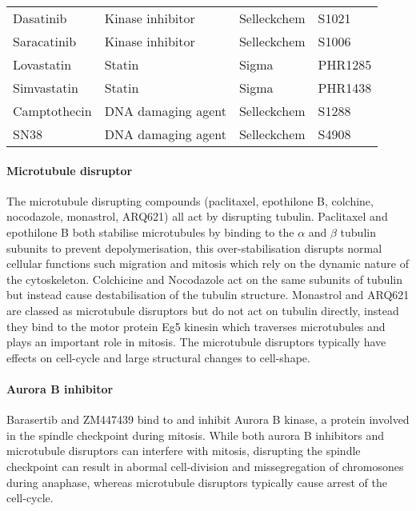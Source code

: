 \documentclass[a4paper,11pt,twoside,openright]{scrbook}
\begin{document}
\begin{table}[]
\begin{footnotesize}
\begin{tabular}{@{}llll@{}}
    Dasatinib       & Kinase inhibitor        & Selleckchem & S1021       \\
    Saracatinib     & Kinase inhibitor        & Selleckchem & S1006       \\
    Lovastatin      & Statin                  & Sigma       & PHR1285     \\
    Simvastatin     & Statin                  & Sigma       & PHR1438     \\
    Camptothecin    & DNA damaging agent      & Selleckchem & S1288       \\
    SN38            & DNA damaging agent      & Selleckchem & S4908       \\ \bottomrule
    \end{tabular}
    \end{footnotesize}
\end{table}

\paragraph{Microtubule disruptor}
The microtubule disrupting compounds (paclitaxel, epothilone B, colchine, nocodazole, monastrol, ARQ621) all act by 
disrupting tubulin.
Paclitaxel and epothilone B both stabilise microtubules by binding to the $\alpha$ and $\beta$ tubulin subunits to 
prevent depolymerisation, this over-stabilisation disrupts normal cellular functions such migration and mitosis which 
rely on the dynamic nature of the cytoskeleton.
Colchicine and Nocodazole act on the same subunits of tubulin but instead cause destabilisation of the tubulin 
structure.
Monastrol and ARQ621 are classed as microtubule disruptors but do not act on tubulin directly, instead they bind to the 
motor protein Eg5 kinesin which traverses microtubules and plays an important role in mitosis.
The microtubule disruptors typically have effects on cell-cycle and large structural changes to cell-shape.

\paragraph{Aurora B inhibitor}
Barasertib and ZM447439 bind to and inhibit Aurora B kinase, a protein involved in the spindle checkpoint during 
mitosis.
While both aurora B inhibitors and microtubule disruptors can interfere with mitosis, disrupting the spindle checkpoint 
can result in abormal cell-division and missegregation of chromosones during anaphase, whereas microtubule disruptors 
typically cause arrest of the cell-cycle.
\end{document}
